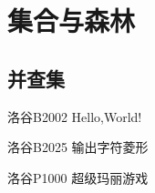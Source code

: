 \chapter{集合与森林}
\section{并查集}



\begin{problemset}
\item 洛谷B2002 Hello,World!
\item 洛谷B2025 输出字符菱形
\item 洛谷P1000 超级玛丽游戏
\end{problemset}


